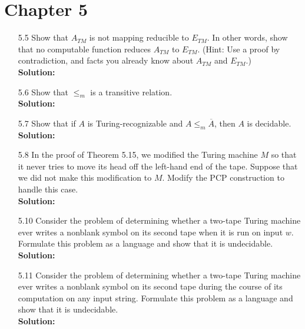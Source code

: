 \chapter*{Chapter 5}
\begin{enumerate}

\item[5.5]Show that $A_{TM}$ is not mapping reducible to $E_{TM}$. In other words, show that no computable function reduces $A_{TM}$ to $E_{TM}$. (Hint: Use a proof by contradiction, and facts you already know about $A_{TM}$ and $E_{TM}$.)
\\
\textbf{Solution:} \alreadyanswered

\item[5.6]Show that $\le_m$ is a transitive relation.
\\
\textbf{Solution:} \alreadyanswered

\item[5.7]Show that if $A$ is Turing-recognizable and $A \le_m \overline{A}$, then $A$ is decidable.
\\
\textbf{Solution:} \alreadyanswered

\item[5.8]In the proof of Theorem 5.15, we modified the Turing machine $M$ so that it never tries to move its head off the left-hand end of the tape. Suppose that we did not make this modification to $M$. Modify the PCP construction to handle this case.
\\
\textbf{Solution:} \alreadyanswered

\item[5.10]Consider the problem of determining whether a two-tape Turing machine ever writes a nonblank symbol on its second tape when it is run on input $w$. Formulate this problem as a language and show that it is undecidable.
\\
\textbf{Solution:} \alreadyanswered

\item[5.11]Consider the problem of determining whether a two-tape Turing machine ever writes a nonblank symbol on its second tape during the course of its computation on any input string. Formulate this problem as a language and show that it is undecidable.
\\
\textbf{Solution:} \alreadyanswered


\end{enumerate}
